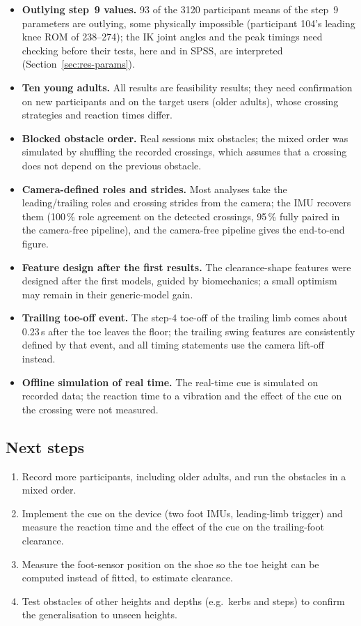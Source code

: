\begin{itemize}
  \item \textbf{Outlying step~9 values.} 93 of the 3120 participant means of the step~9 parameters are outlying, some physically
  impossible (participant 104's leading knee ROM of 238--274\textdegree{}); the IK joint angles and the peak timings need checking
  before their tests, here and in SPSS, are interpreted (Section~\ref{sec:res-params}).
  \item \textbf{Ten young adults.} All results are feasibility results; they need confirmation on new participants and on the
  target users (older adults), whose crossing strategies and reaction times differ.
  \item \textbf{Blocked obstacle order.} Real sessions mix obstacles; the mixed order was simulated by shuffling the recorded
  crossings, which assumes that a crossing does not depend on the previous obstacle.
  \item \textbf{Camera-defined roles and strides.} Most analyses take the leading/trailing roles and crossing strides from the camera;
  the IMU recovers them (100\,\% role agreement on the detected crossings, 95\,\% fully paired in the camera-free pipeline), and the
  camera-free pipeline gives the end-to-end figure.
  \item \textbf{Feature design after the first results.} The clearance-shape features were designed after the first models, guided
  by biomechanics; a small optimism may remain in their generic-model gain.
  \item \textbf{Trailing toe-off event.} The step-4 toe-off of the trailing limb comes about 0.23\,s after the toe leaves the floor; the
  trailing swing features are consistently defined by that event, and all timing statements use the camera lift-off instead.
  \item \textbf{Offline simulation of real time.} The real-time cue is simulated on recorded data; the reaction time to a vibration and
  the effect of the cue on the crossing were not measured.
\end{itemize}

\subsection{Next steps}

\begin{enumerate}
  \item Record more participants, including older adults, and run the obstacles in a mixed order.
  \item Implement the cue on the device (two foot IMUs, leading-limb trigger) and measure the reaction time and the effect of the cue
  on the trailing-foot clearance.
  \item Measure the foot-sensor position on the shoe so the toe height can be computed instead of fitted, to estimate clearance.
  \item Test obstacles of other heights and depths (e.g.\ kerbs and steps) to confirm the generalisation to unseen heights.
\end{enumerate}
